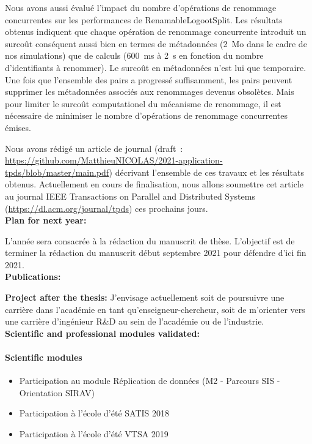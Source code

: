 \documentclass[12pt]{article}
\begin{document}
Nous avons aussi évalué l'impact du nombre d'opérations de renommage concurrentes sur les performances de RenamableLogootSplit.
Les résultats obtenus indiquent que chaque opération de renommage concurrente introduit un surcoût conséquent aussi bien en termes de métadonnées (\SI{2}{\mega o} dans le cadre de nos simulations) que de calculs (\SI{600}{\milli\second} à \SI{2}{\second} en fonction du nombre d'identifiants à renommer).
Le surcoût en métadonnées n'est lui que temporaire.
Une fois que l'ensemble des pairs a progressé suffisamment, les pairs peuvent supprimer les métadonnées associés aux renommages devenus obsolètes.
Mais pour limiter le surcoût computationel du mécanisme de renommage, il est nécessaire de minimiser le nombre d'opérations de renommage concurrentes émises.

Nous avons rédigé un article de journal (draft~: \url{https://github.com/MatthieuNICOLAS/2021-application-tpds/blob/master/main.pdf}) décrivant l'ensemble de ces travaux et les résultats obtenus.
Actuellement en cours de finalisation, nous allons soumettre cet article au journal IEEE Transactions on Parallel and Distributed Systems (\url{https://dl.acm.org/journal/tpds}) ces prochains jours.
\\


\noindent\textbf{Plan for next year:}

L'année sera consacrée à la rédaction du manuscrit de thèse.
L'objectif est de terminer la rédaction du manuscrit début septembre 2021 pour défendre d'ici fin 2021.
\\

\noindent\textbf{Publications:}


\nocite{*}

\noindent\textbf{Project after the thesis:}
J'envisage actuellement soit de poursuivre une carrière dans l'académie en tant qu'enseigneur-chercheur, soit de m'orienter vers une carrière d'ingénieur R\&D au sein de l'académie ou de l'industrie.
\\

\noindent\textbf{Scientific and professional modules validated:}
\paragraph{\footnotesize Scientific modules}
  \begin{itemize}
      \itemsep0em
      \item Participation au module Réplication de données (M2 - Parcours SIS - Orientation SIRAV)
      \item Participation à l'école d'été SATIS 2018
      \item Participation à l'école d'été VTSA 2019
  \end{itemize}
\end{document}
